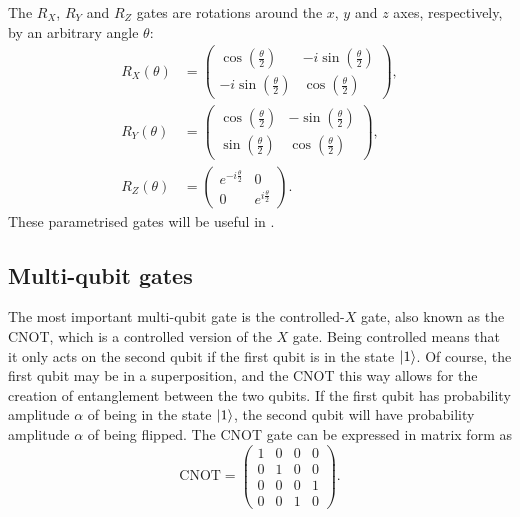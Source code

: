 The $R_X$, $R_Y$ and $R_Z$ gates are rotations around the $x$, $y$ and $z$ axes, respectively, by an arbitrary angle $\theta$:
\begin{align*}
    R_X(\theta) & = \begin{pmatrix} \cos\left(\frac{\theta}{2}\right) & -i \sin\left(\frac{\theta}{2}\right) \\ -i \sin\left(\frac{\theta}{2}\right) & \cos\left(\frac{\theta}{2}\right) \end{pmatrix}, \\
    R_Y(\theta) & = \begin{pmatrix} \cos\left(\frac{\theta}{2}\right) & -\sin\left(\frac{\theta}{2}\right) \\ \sin\left(\frac{\theta}{2}\right) & \cos\left(\frac{\theta}{2}\right) \end{pmatrix},      \\
    R_Z(\theta) & = \begin{pmatrix} e^{-i\frac{\theta}{2}} & 0 \\ 0 & e^{i\frac{\theta}{2}} \end{pmatrix}.
\end{align*}
These parametrised gates will be useful in .

\subsection{Multi-qubit gates}
The most important multi-qubit gate is the controlled-$X$ gate, also known as the CNOT, which is a controlled version of the $X$ gate.
Being controlled means that it only acts on the second qubit if the first qubit is in the state $\ket{1}$.
Of course, the first qubit may be in a superposition, and the CNOT this way allows for the creation of entanglement between the two qubits.
If the first qubit has probability amplitude $\alpha$ of being in the state $\ket{1}$, the second qubit will have probability amplitude $\alpha$ of being flipped.
The CNOT gate can be expressed in matrix form as
\begin{equation}
    \text{CNOT} = \begin{pmatrix} 1 & 0 & 0 & 0 \\ 0 & 1 & 0 & 0 \\ 0 & 0 & 0 & 1 \\ 0 & 0 & 1 & 0 \end{pmatrix}.
\end{equation}


